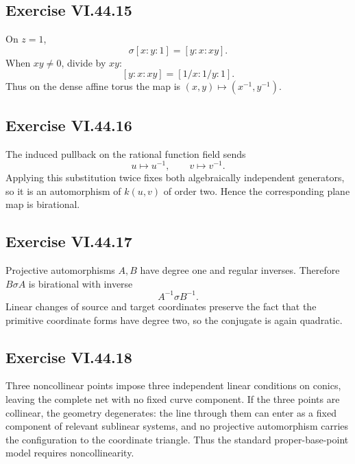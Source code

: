 \subsection*{Exercise VI.44.15}
\begin{solution}
On \(z=1\),
\[
\sigma[x:y:1]=[y:x:xy].
\]
When \(xy\neq0\), divide by \(xy\):
\[
[y:x:xy]=[1/x:1/y:1].
\]
Thus on the dense affine torus the map is \((x,y)\mapsto(x^{-1},y^{-1})\).
\end{solution}

\subsection*{Exercise VI.44.16}
\begin{solution}
The induced pullback on the rational function field sends
\[
u\mapsto u^{-1},\qquad v\mapsto v^{-1}.
\]
Applying this substitution twice fixes both algebraically independent generators, so it is an automorphism of \(k(u,v)\) of order two.  Hence the corresponding plane map is birational.
\end{solution}

\subsection*{Exercise VI.44.17}
\begin{solution}
Projective automorphisms \(A,B\) have degree one and regular inverses.  Therefore \(B\sigma A\) is birational with inverse
\[
A^{-1}\sigma B^{-1}.
\]
Linear changes of source and target coordinates preserve the fact that the primitive coordinate forms have degree two, so the conjugate is again quadratic.
\end{solution}

\subsection*{Exercise VI.44.18}
\begin{solution}
Three noncollinear points impose three independent linear conditions on conics, leaving the complete net with no fixed curve component.  If the three points are collinear, the geometry degenerates: the line through them can enter as a fixed component of relevant sublinear systems, and no projective automorphism carries the configuration to the coordinate triangle.  Thus the standard proper-base-point model requires noncollinearity.
\end{solution}


